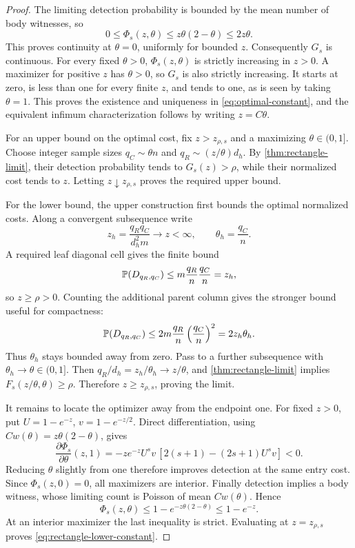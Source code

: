 \begin{proof}
The limiting detection probability is bounded by the mean number of
body witnesses, so
\[
 0\le\Phi_s(z,\theta)\le z\theta(2-\theta)\le2z\theta.
\]
This proves continuity at \(\theta=0\), uniformly for bounded \(z\).
Consequently \(G_s\) is continuous. For every fixed \(\theta>0\),
\(\Phi_s(z,\theta)\) is strictly increasing in \(z>0\). A maximizer
for positive \(z\) has \(\theta>0\), so \(G_s\) is also strictly
increasing. It starts at zero, is less than one for every finite \(z\),
and tends to one, as is seen by taking \(\theta=1\). This proves
the existence and uniqueness in \eqref{eq:optimal-constant}, and the
equivalent infimum characterization follows by writing \(z=C\theta\).

For an upper bound on the optimal cost, fix \(z>z_{\rho,s}\) and a
maximizing \(\theta\in(0,1]\). Choose integer sample sizes
\(q_C\sim\theta n\) and \(q_R\sim(z/\theta)d_h\). By
\cref{thm:rectangle-limit}, their detection probability tends to
\(G_s(z)>\rho\), while their normalized cost tends to \(z\).
Letting \(z\downarrow z_{\rho,s}\) proves the required upper bound.

For the lower bound, the upper construction first bounds the optimal
normalized costs. Along a convergent subsequence write
\[
 z_h=\frac{q_Rq_C}{d_h^2m}\longrightarrow z<\infty,
 \qquad \theta_h=\frac{q_C}{n}.
\]
A required leaf diagonal cell gives the finite bound
\begin{equation}
 \mathbb P(D_{q_R,q_C})\le
 m\frac{q_R}{n}\frac{q_C}{n}=z_h,
 \label{eq:rectangle-finite-lower}
\end{equation}
so \(z\ge\rho>0\). Counting the additional parent column gives the
stronger bound useful for compactness:
\begin{equation}
 \mathbb P(D_{q_R,q_C})\le
 2m\frac{q_R}{n}\left(\frac{q_C}{n}\right)^2
 =2z_h\theta_h.
 \label{eq:rectangle-compactness}
\end{equation}
Thus \(\theta_h\) stays bounded away from zero. Pass to a further
subsequence with \(\theta_h\to\theta\in(0,1]\). Then
\(q_R/d_h=z_h/\theta_h\to z/\theta\), and
\cref{thm:rectangle-limit} implies \(F_s(z/\theta,\theta)\ge\rho\).
Therefore \(z\ge z_{\rho,s}\), proving the limit.

It remains to locate the optimizer away from the endpoint one.
For fixed \(z>0\), put \(U=1-e^{-z}\), \(v=1-e^{-z/2}\).
Direct differentiation, using
\(Cw(\theta)=z\theta(2-\theta)\), gives
\begin{equation}
 \frac{\partial\Phi_s}{\partial\theta}(z,1)
 =-ze^{-z}U^sv\,[2(s+1)-(2s+1)U^sv]<0.
 \label{eq:interior-optimizer}
\end{equation}
Reducing \(\theta\) slightly from one therefore improves detection
at the same entry cost. Since \(\Phi_s(z,0)=0\), all maximizers
are interior. Finally detection implies a body witness, whose limiting
count is Poisson of mean \(Cw(\theta)\). Hence
\[
 \Phi_s(z,\theta)\le1-e^{-z\theta(2-\theta)}\le1-e^{-z}.
\]
At an interior maximizer the last inequality is strict. Evaluating at
\(z=z_{\rho,s}\) proves \eqref{eq:rectangle-lower-constant}.
\end{proof}

